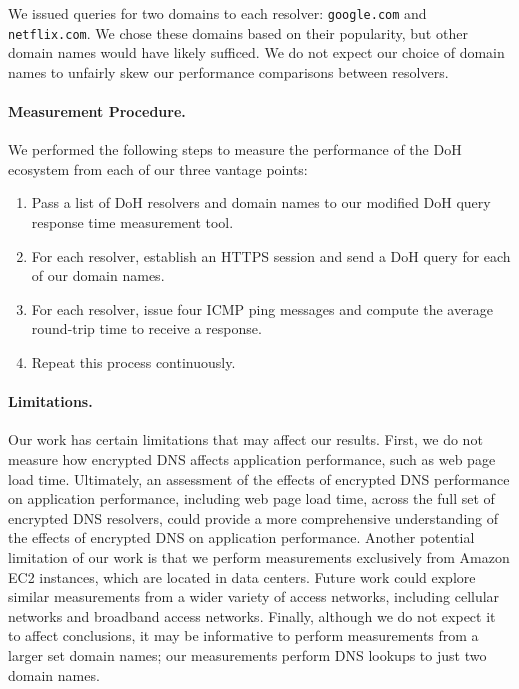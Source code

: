 We issued queries for two domains to each resolver: \texttt{google.com} and
\texttt{netflix.com}.  We chose these domains based on their popularity, but
other domain names would have likely sufficed.  We do not expect our choice of
domain names to unfairly skew our performance comparisons between resolvers.

\paragraph{Measurement Procedure.} We performed the following steps to measure
the performance of the DoH ecosystem from each of our three vantage points:
\begin{enumerate} \item Pass a list of DoH resolvers and domain names to our
            modified DoH query response time measurement tool.  \item For each
            resolver, establish an HTTPS session and send a DoH query for each
        of our domain names.  \item For each resolver, issue four ICMP ping
            messages and compute the average round-trip time to receive a
            response.  \item Repeat this process continuously.
\end{enumerate}

\paragraph{Limitations.} Our work has certain limitations that may affect our
results.  First, we do not measure how encrypted DNS affects application
performance, such as web page load time. Ultimately, an assessment of the
effects of encrypted DNS performance on application performance, including web
page load time, across the full set of encrypted DNS resolvers, could provide
a more comprehensive understanding of the effects of encrypted DNS on
application performance.  Another potential limitation of our work is that we
perform measurements exclusively from Amazon EC2 instances, which are located
in data centers. Future work could explore similar measurements from a wider
variety of access networks, including cellular networks and broadband access
networks.  Finally, although we do not expect it to affect conclusions, it may
be informative to perform measurements from a larger set domain names; our
measurements perform DNS lookups to just two domain names.
